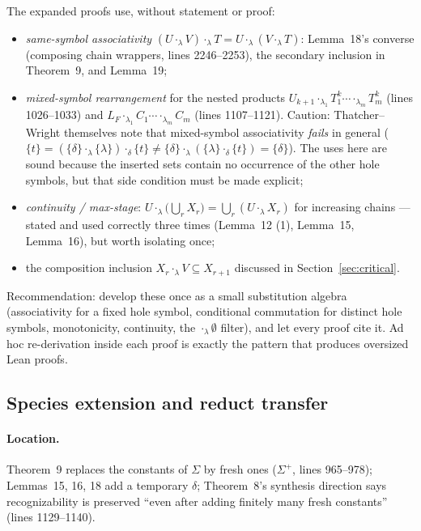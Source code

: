 \documentclass[11pt]{article}
\newcommand{\TW}{Thatcher--Wright}
\begin{document}
The expanded proofs use, without statement or proof:
\begin{itemize}[leftmargin=*]
  \item \emph{same-symbol associativity}
    \((U\cdot_\lambda V)\cdot_\lambda T=U\cdot_\lambda(V\cdot_\lambda T)\):
    Lemma~18's converse (composing chain wrappers, lines 2246--2253), the
    secondary inclusion in Theorem~9, and Lemma~19;
  \item \emph{mixed-symbol rearrangement} for the nested products
    \(U_{k+1}\cdot_{\lambda_1}T_1^k\cdots\cdot_{\lambda_m}T_m^k\)
    (lines 1026--1033) and
    \(L_F\cdot_{\lambda_1}C_1\cdots\cdot_{\lambda_m}C_m\)
    (lines 1107--1121).  Caution: \TW{} themselves note that mixed-symbol
    associativity \emph{fails} in general
    (\(\{t\}=(\{\delta\}\cdot_\lambda\{\lambda\})\cdot_\delta\{t\}
      \ne\{\delta\}\cdot_\lambda(\{\lambda\}\cdot_\delta\{t\})=\{\delta\}\)).
    The uses here are sound because the inserted sets contain no occurrence of
    the other hole symbols, but that side condition must be made explicit;
  \item \emph{continuity / max-stage}: \(U\cdot_\lambda\bigl(\bigcup_rX_r\bigr)
    =\bigcup_r(U\cdot_\lambda X_r)\) for increasing chains --- stated and used
    correctly three times (Lemma~12 (1), Lemma~15, Lemma~16), but worth
    isolating once;
  \item the composition inclusion \(X_r\cdot_\lambda V\subseteq X_{r+1}\)
    discussed in Section~\ref{sec:critical}.
\end{itemize}
Recommendation: develop these once as a small substitution algebra
(associativity for a fixed hole symbol, conditional commutation for distinct
hole symbols, monotonicity, continuity, the \(\cdot_\lambda\emptyset\)
filter), and let every proof cite it.  Ad hoc re-derivation inside each proof
is exactly the pattern that produces oversized Lean proofs.

\subsection{Species extension and reduct transfer}

\paragraph{Location.} Theorem~9 replaces the constants of \(\Sigma\) by fresh
ones (\(\Sigma^+\), lines 965--978); Lemmas~15, 16, 18 add a temporary
\(\delta\); Theorem~8's synthesis direction says recognizability is preserved
``even after adding finitely many fresh constants'' (lines 1129--1140).
\end{document}
